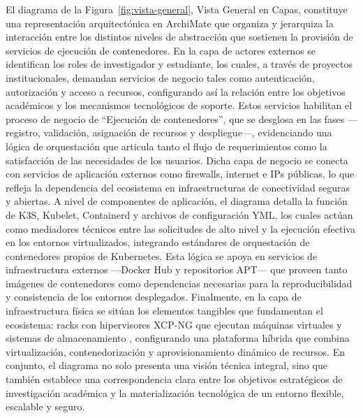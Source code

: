 El diagrama de la Figura~\ref{fig:vista-general}, Vista General en Capas, constituye una representación arquitectónica en ArchiMate que organiza y jerarquiza la interacción entre los distintos niveles de abstracción que sostienen la provisión de servicios de ejecución de contenedores. En la capa de actores externos se identifican los roles de investigador y estudiante, los cuales, a través de proyectos institucionales, demandan servicios de negocio tales como autenticación, autorización y acceso a recursos, configurando así la relación entre los objetivos académicos y los mecanismos tecnológicos de soporte. Estos servicios habilitan el proceso de negocio de “Ejecución de contenedores”, que se desglosa en las fases —registro, validación, asignación de recursos y despliegue—, evidenciando una lógica de orquestación que articula tanto el flujo de requerimientos como la satisfacción de las necesidades de los usuarios. Dicha capa de negocio se conecta con servicios de aplicación externos como firewalls, internet e IPs públicas, lo que refleja la dependencia del ecosistema en infraestructuras de conectividad seguras y abiertas. A nivel de componentes de aplicación, el diagrama detalla la función de K3S, Kubelet, Containerd y archivos de configuración YML, los cuales actúan como mediadores técnicos entre las solicitudes de alto nivel y la ejecución efectiva en los entornos virtualizados, integrando estándares de orquestación de contenedores propios de Kubernetes. Esta lógica se apoya en servicios de infraestructura externos —Docker Hub y repositorios APT— que proveen tanto imágenes de contenedores como dependencias necesarias para la reproducibilidad y consistencia de los entornos desplegados. Finalmente, en la capa de infraestructura física se sitúan los elementos tangibles que fundamentan el ecosistema: racks con hipervisores XCP-NG que ejecutan máquinas virtuales y sistemas de almacenamiento \NAS, configurando una plataforma híbrida que combina virtualización, contenedorización y aprovisionamiento dinámico de recursos. En conjunto, el diagrama no solo presenta una visión técnica integral, sino que también establece una correspondencia clara entre los objetivos estratégicos de investigación académica y la materialización tecnológica de un entorno flexible, escalable y seguro.
